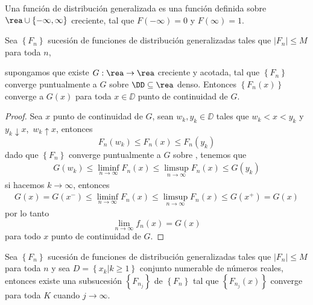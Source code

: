 Una funci\'on de distribuci\'on generalizada es una funci\'on definida sobre $\rea\cup\left\{-\infty,\infty\right\}$ creciente, tal que $F\left(-\infty\right)=0$ y
$F\left(\infty\right)=1$.
\begin{Lema}\label{Lema1}
Sea $\left\{F_{n}\right\}$ sucesi\'on de funciones de distribuci\'on
generalizadas tales que $\left|F_{n}\right|\leq M$ para toda $n$,

supongamos que existe $G:\rea\rightarrow\rea$ creciente y acotada,
tal que $\left\{F_{n}\right\}$ converge puntualmente a $G$ sobre
$\DD\subseteq\rea$ denso. Entonces
$\left\{F_{n}\left(x\right)\right\}$ converge a $G\left(x\right)$
para toda $x\in \DD$ punto de continuidad de $G$.
\end{Lema}
\begin{proof}
Sea $x$ punto de continuidad de $G$, sean $w_{k},y_{k}\in \DD$
tales que $w_{k}<x<y_{k}$ y $y_{k}\downarrow x$,\ $w_{k}\uparrow
x$, entonces \[F_{n}\left(w_{k}\right)\leq F_{n}\left(x\right)\leq
F_{n}\left(y_{k}\right)\] dado que $\left\{F_{n}\right\}$ converge
puntualmente a $G$ sobre \DD, tenemos que
\begin{eqnarray*}
G\left(w_{k}\right)\leq \liminf_{n\rightarrow\infty}F_{n}\left(x\right)\leq \limsup_{n\rightarrow\infty}F_{n}\left(x\right)\leq G\left(y_{k}\right)
\end{eqnarray*} si hacemos $k\rightarrow\infty$, entonces
\begin{eqnarray*}
G\left(x\right)=G\left(x^{-}\right)\leq \liminf_{n\rightarrow\infty}F_{n}\left(x\right)\leq \limsup_{n\rightarrow\infty}F_{n}\left(x\right)\leq G\left(x^{+}\right)=G\left(x\right)
\end{eqnarray*} por lo tanto \[\lim_{n\rightarrow\infty}f_{n}\left(x\right)=G\left(x\right)\] para todo $x$ punto de continuidad de $G$.
\end{proof}
\begin{Lema}\label{Lema2}
Sea $\left\{F_{n}\right\}$ sucesi\'on de funciones de distribuci\'on
generalizadas tales que $\left|F_{n}\right|\leq M$ para toda $n$ y
sea $D=\left\{x_{k}|k\geq 1\right\}$ conjunto numerable de n\'umeros
reales, entonces existe una subsucesi\'on $\left\{F_{n_{j}}\right\}$
de $\left\{F_{n}\right\}$ tal que
$\left\{F_{n_{j}}\left(x\right)\right\}$ converge para toda $K$
cuando $j\rightarrow\infty$.
\end{Lema}
